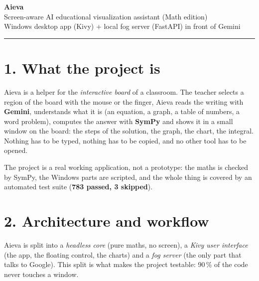 \documentclass[10pt,a4paper]{article}
\begin{document}
\begin{center}
  {\LARGE\bfseries\color{aievaBlue} Aieva}\\[2pt]
  {\large Screen-aware AI educational visualization assistant (Math edition)}\\[3pt]
  {\small Windows desktop app (Kivy) + local fog server (FastAPI) in front of Gemini}
\end{center}

\hrule\vspace{6pt}

\section*{1. What the project is}

Aieva is a helper for the \emph{interactive board} of a classroom. The teacher
selects a region of the board with the mouse or the finger, Aieva reads the
writing with \textbf{Gemini}, understands what it is (an equation, a graph, a
table of numbers, a word problem), computes the answer with \textbf{SymPy} and
shows it in a small window on the board: the steps of the solution, the graph,
the chart, the integral. Nothing has to be typed, nothing has to be copied, and
no other tool has to be opened.

The project is a real working application, not a prototype: the maths is
checked by SymPy, the Windows parts are scripted, and the whole thing is
covered by an automated test suite (\textbf{783 passed, 3 skipped}).

\section*{2. Architecture and workflow}

Aieva is split into a \emph{headless core} (pure maths, no screen), a
\emph{Kivy user interface} (the app, the floating control, the charts) and a
\emph{fog server} (the only part that talks to Google). This split is what
makes the project testable: 90\,\% of the code never touches a window.
\end{document}
